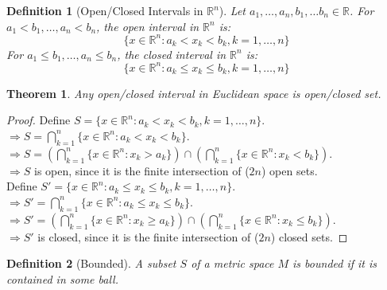 \documentclass{article}
\newtheorem{definition}{Definition}[section]
\newtheorem{theorem}{Theorem}[section]
\begin{document}
			\begin{definition}[Open/Closed Intervals in $\mathbb{R}^n$]
				\label{open closed intervals}
				Let $a_1, \ldots, a_n, b_1, \ldots b_n \in \mathbb{R}$.
				For $a_1 < b_1, \ldots, a_n < b_n$, the open interval in $\mathbb{R}^n$ is:
				$$ \{ x \in \mathbb{R}^n: a_k < x_k < b_k, k = 1, \ldots, n \}$$
				For $a_1 \leq b_1, \ldots, a_n \leq b_n$, the closed interval in $\mathbb{R}^n$ is:
				$$ \{ x \in \mathbb{R}^n: a_k \leq x_k \leq b_k, k = 1, \ldots, n \}$$
			\end{definition}

			\begin{theorem}
				Any open/closed interval in Euclidean space is open/closed set.
			\end{theorem}
			\begin{proof} 
				Define $S = \{ x \in \mathbb{R}^n: a_k < x_k < b_k, k = 1, \ldots, n \}$. \\
				$\Rightarrow S = \bigcap_{k=1}^{n} \{ x \in \mathbb{R}^n: a_k < x_k < b_k \}$. \\
				$\Rightarrow S = (\bigcap_{k=1}^{n} \{ x \in \mathbb{R}^n: x_k > a_k \}) \cap (\bigcap_{k=1}^{n} \{ x \in \mathbb{R}^n: x_k < b_k \})$. \\
				$\Rightarrow S$ is open, since it is the finite intersection of ($2n$) open sets. \\

				Define $S' = \{ x \in \mathbb{R}^n: a_k \leq x_k \leq b_k, k = 1, \ldots, n \}$. \\
				$\Rightarrow S' = \bigcap_{k=1}^{n} \{ x \in \mathbb{R}^n: a_k \leq x_k \leq b_k \}$. \\
				$\Rightarrow S' = (\bigcap_{k=1}^{n} \{ x \in \mathbb{R}^n: x_k \geq a_k \}) \cap (\bigcap_{k=1}^{n} \{ x \in \mathbb{R}^n: x_k \leq b_k \})$. \\
				$\Rightarrow S'$ is closed, since it is the finite intersection of ($2n$) closed sets.
			\end{proof}

			\begin{definition}[Bounded]
				\label{bounded}
				A subset $S$ of a metric space $M$ is bounded if it is contained in some ball.
			\end{definition}
\end{document}
